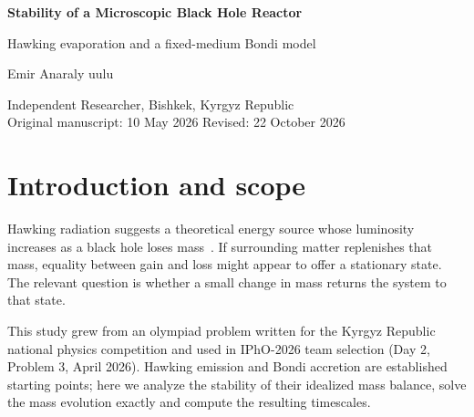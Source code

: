 \documentclass[11pt,a4paper]{article}
\begin{document}
\begin{center}
{\LARGE\bfseries Stability of a Microscopic Black Hole Reactor\par}
\vspace{5pt}
{\large Hawking evaporation and a fixed-medium Bondi model\par}
\vspace{13pt}
{\normalsize Emir Anaraly uulu\par}
Independent Researcher, Bishkek, Kyrgyz Republic\\[7pt]
Original manuscript: 10 May 2026 \quad\textbar\quad Revised: 22 October 2026
\end{center}
\vspace{6pt}

\begin{abstract}
Can a fixed surrounding medium balance the mass loss of a microscopic black hole? We combine idealized Bondi accretion with a blackbody approximation to Hawking emission, then analyze the resulting mass equation. We find a single positive balance, but a small change in mass drives the system away from it. An exact implicit solution and numerical trajectories show how the evolution differs near and far from the balance. For an illustrative water-like choice of parameters, the reference black hole evaporates rapidly in the blackbody model, while departures from a nearly balanced state can be slow. The instability is an exact property of the fixed-coefficient equation. Continuum accretion, realistic emission spectra and the response of the medium to the hole's radiation lie outside the model.
\end{abstract}

\section{Introduction and scope}
Hawking radiation suggests a theoretical energy source whose luminosity increases as a black hole loses mass~\cite{hawking}. If surrounding matter replenishes that mass, equality between gain and loss might appear to offer a stationary state. The relevant question is whether a small change in mass returns the system to that state.

This study grew from an olympiad problem written for the Kyrgyz Republic national physics competition and used in IPhO-2026 team selection (Day 2, Problem 3, April 2026). Hawking emission and Bondi accretion are established starting points; here we analyze the stability of their idealized mass balance, solve the mass evolution exactly and compute the resulting timescales.
\end{document}
